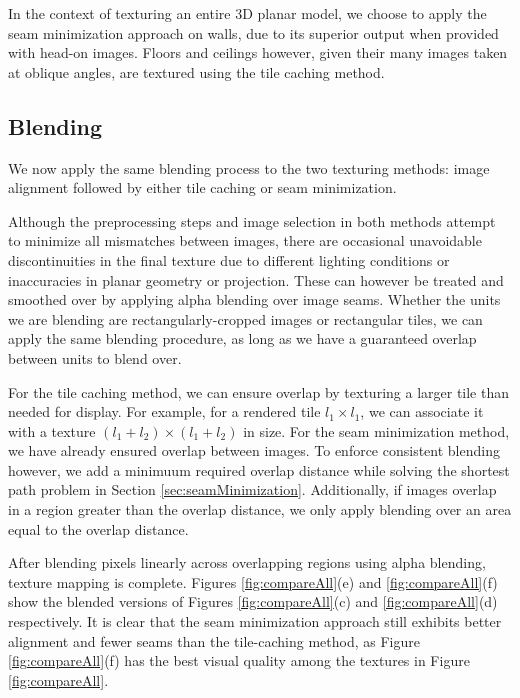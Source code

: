 \documentclass[10pt,twocolumn,letterpaper]{article}
\begin{document}
In the context of texturing an entire 3D planar model, we choose to
apply the seam minimization approach on walls, due to its superior
output when provided with head-on images. Floors and ceilings however,
given their many images taken at oblique angles, are textured using
the tile caching method.



\subsection{Blending}
\label{sec:blending}
We now apply the same blending process to the two texturing methods:
image alignment followed by either tile caching or seam
minimization.

Although the preprocessing steps and image selection in both methods
attempt to minimize all mismatches between images, there are
occasional unavoidable discontinuities in the final texture due to
different lighting conditions or inaccuracies in planar geometry or
projection. These can however be treated and smoothed over by applying
alpha blending over image seams.  Whether the units we are blending
are rectangularly-cropped images or rectangular tiles, we can apply
the same blending procedure, as long as we have a guaranteed overlap
between units to blend over.

For the tile caching method, we can ensure overlap by texturing a
larger tile than needed for display. For example, for a rendered tile
$l_1 \times l_1$, we can associate it with a texture $(l_1 + l_2)
\times (l_1 + l_2)$ in size. For the seam minimization method, we have
already ensured overlap between images. To enforce consistent blending
however, we add a minimuum required overlap distance while solving the
shortest path problem in Section
\ref{sec:seamMinimization}. Additionally, if images overlap in a
region greater than the overlap distance, we only apply blending over
an area equal to the overlap distance.

After blending pixels linearly across overlapping regions using alpha
blending, texture mapping is complete. Figures \ref{fig:compareAll}(e)
and \ref{fig:compareAll}(f) show the blended versions of Figures
\ref{fig:compareAll}(c) and \ref{fig:compareAll}(d) respectively. It
is clear that the seam minimization approach still exhibits better
alignment and fewer seams than the tile-caching method, as Figure
\ref{fig:compareAll}(f) has the best visual quality among the textures
in Figure \ref{fig:compareAll}.
\end{document}
